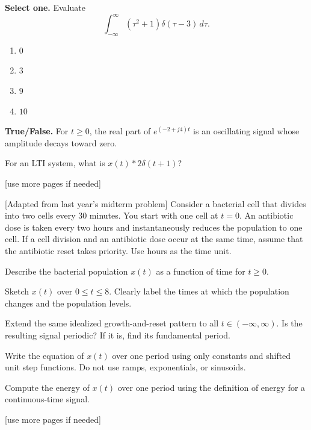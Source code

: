 \documentclass{ee102_pset}
\begin{document}
\problempart{[3 points]} \textbf{Select one.} Evaluate
\[
\int_{-\infty}^{\infty}(\tau^2+1)\delta(\tau-3)\,d\tau.
\]
\begin{enumerate}
    \item $0$
    \item $3$
    \item $9$
    \item $10$
\end{enumerate}

\problempart{[3 points]} \textbf{True/False.} For $t\geq 0$, the real part of
$e^{(-2+j4)t}$ is an oscillating signal whose amplitude decays toward zero.

\problempart{[6 points]} For an LTI system, what is
$x(t)*2\delta(t+1)$?
\vspace*{\fill}
\begin{center}
[use more pages if needed]
\end{center}

 [Adapted from last year's midterm problem]
Consider a bacterial cell that divides into two cells every 30 minutes. You
start with one cell at $t=0$. An antibiotic dose is taken every two hours and
instantaneously reduces the population to one cell. If a cell division and an
antibiotic dose occur at the same time, assume that the antibiotic reset takes
priority. Use hours as the time unit.

\problempart{[5 points]} Describe the bacterial population $x(t)$ as a function
of time for $t\geq 0$.

\problempart{[5 points]} Sketch $x(t)$ over $0\leq t\leq 8$. Clearly label the
times at which the population changes and the population levels.

\problempart{[5 points]} Extend the same idealized growth-and-reset pattern to
all $t\in(-\infty,\infty)$. Is the resulting signal periodic? If it is, find
its fundamental period.

\problempart{[5 points]} Write the equation of $x(t)$ over one period using only
constants and shifted unit step functions. Do not use ramps, exponentials, or
sinusoids.

\problempart{[5 points]} Compute the energy of $x(t)$ over one period using the
definition of energy for a continuous-time signal.

\vspace*{\fill}
\begin{center}
[use more pages if needed]
\end{center}
\end{document}
